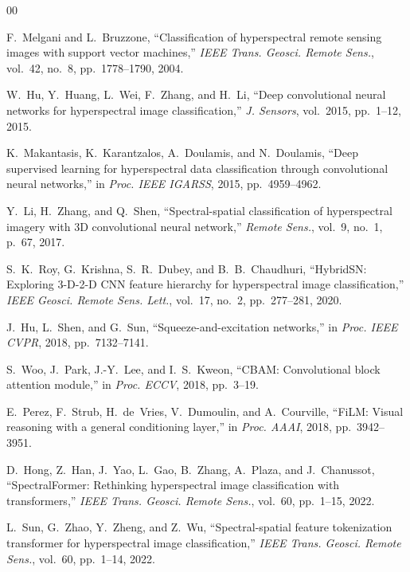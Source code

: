 \documentclass[conference]{IEEEtran}
\begin{document}
\begin{thebibliography}{00}

F.~Melgani and L.~Bruzzone, ``Classification of hyperspectral remote sensing images with support vector machines,'' \textit{IEEE Trans. Geosci. Remote Sens.}, vol.~42, no.~8, pp.~1778--1790, 2004.

W.~Hu, Y.~Huang, L.~Wei, F.~Zhang, and H.~Li, ``Deep convolutional neural networks for hyperspectral image classification,'' \textit{J. Sensors}, vol.~2015, pp.~1--12, 2015.

K.~Makantasis, K.~Karantzalos, A.~Doulamis, and N.~Doulamis, ``Deep supervised learning for hyperspectral data classification through convolutional neural networks,'' in \textit{Proc. IEEE IGARSS}, 2015, pp.~4959--4962.

Y.~Li, H.~Zhang, and Q.~Shen, ``Spectral-spatial classification of hyperspectral imagery with 3D convolutional neural network,'' \textit{Remote Sens.}, vol.~9, no.~1, p.~67, 2017.

S.~K.~Roy, G.~Krishna, S.~R.~Dubey, and B.~B.~Chaudhuri, ``HybridSN: Exploring 3-D-2-D CNN feature hierarchy for hyperspectral image classification,'' \textit{IEEE Geosci. Remote Sens. Lett.}, vol.~17, no.~2, pp.~277--281, 2020.

J.~Hu, L.~Shen, and G.~Sun, ``Squeeze-and-excitation networks,'' in \textit{Proc. IEEE CVPR}, 2018, pp.~7132--7141.

S.~Woo, J.~Park, J.-Y.~Lee, and I.~S.~Kweon, ``CBAM: Convolutional block attention module,'' in \textit{Proc. ECCV}, 2018, pp.~3--19.

E.~Perez, F.~Strub, H.~de~Vries, V.~Dumoulin, and A.~Courville, ``FiLM: Visual reasoning with a general conditioning layer,'' in \textit{Proc. AAAI}, 2018, pp.~3942--3951.

D.~Hong, Z.~Han, J.~Yao, L.~Gao, B.~Zhang, A.~Plaza, and J.~Chanussot, ``SpectralFormer: Rethinking hyperspectral image classification with transformers,'' \textit{IEEE Trans. Geosci. Remote Sens.}, vol.~60, pp.~1--15, 2022.

L.~Sun, G.~Zhao, Y.~Zheng, and Z.~Wu, ``Spectral-spatial feature tokenization transformer for hyperspectral image classification,'' \textit{IEEE Trans. Geosci. Remote Sens.}, vol.~60, pp.~1--14, 2022.


\end{thebibliography}
\end{document}
